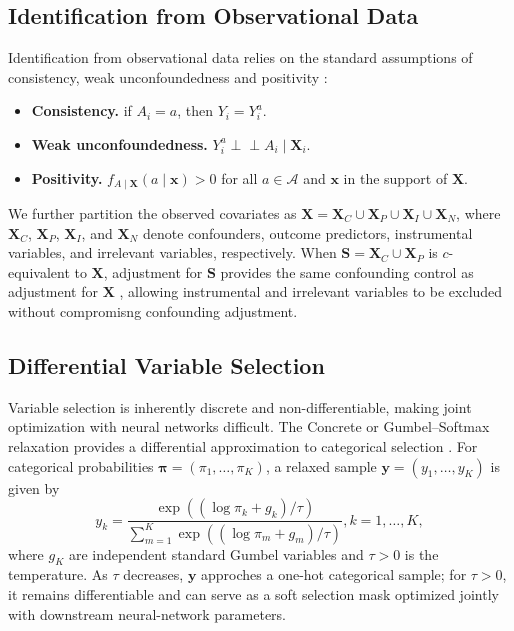 \documentclass[twoside]{article}
\theoremstyle{plain}
\theoremstyle{definition}
\theoremstyle{remark}
\newtheorem{proof sketch}[theorem]{Proof Sketch}
\begin{document}
{\subsection{Identification from Observational Data}
Identification from observational data relies on the standard assumptions of consistency, weak unconfoundedness and positivity 
\citep{rosenbaum1983central, hirano2004propensity, imai2004causal}:
\begin{itemize}
    \item \textbf{Consistency.} if $A_i=a$, then  $Y_i=Y_i^a$.
    \item \textbf{Weak unconfoundedness.} $Y_i^a \perp\!\!\!\perp A_i \mid \mathbf{X}_i$.
    \item \textbf{Positivity.}  
    $f_{A\mid \mathbf{X}}(a\mid \mathbf{x})>0$ for all $a\in\mathcal{A}$ and $\mathbf{x}$ in the support of $\mathbf{X}$.
\end{itemize}
We further partition the observed covariates as $\mathbf{X} = \mathbf{X}_C \cup \mathbf{X}_P \cup \mathbf{X}_I \cup \mathbf{X}_N$, 
where $\mathbf{X}_C$, $\mathbf{X}_P$, $\mathbf{X}_I$, and $\mathbf{X}_N$ denote confounders, outcome predictors, instrumental variables, and irrelevant variables, respectively. 
When $\textbf{S}= \mathbf{X}_C \cup \mathbf{X}_P$ is \(c\)-equivalent to  \(\mathbf{X}\), adjustment for $\textbf{S}$ provides the same confounding control as adjustment for  $\mathbf{X}$ \citep{pearl2014confounding, greenewald2021high}, allowing instrumental and irrelevant variables to be excluded without compromisng confounding adjustment. 


\vspace{-0.5em}
\subsection{Differential Variable Selection}
\vspace{-0.5em}
Variable selection is inherently discrete and non-differentiable, making joint optimization with neural networks difficult. The Concrete or Gumbel--Softmax relaxation provides a differential approximation to categorical selection \citep{maddison2017concrete,jang2017categorical}.
For categorical probabilities \(\boldsymbol{\pi}=(\pi_1,\ldots,\pi_K)\), 
a relaxed sample \(\boldsymbol{y}=(y_1,\ldots,y_K)\) is given by
\begin{equation}
    y_k =
    \frac{
        \exp\left((\log \pi_k + g_k)/\tau\right)
    }{
        \sum_{m=1}^{K}
        \exp\left((\log \pi_m + g_m)/\tau\right)
    },
    k=1,\ldots,K,
\end{equation}
where $g_K$ are independent standard Gumbel variables and \(\tau>0\) is the temperature. As $\tau$ decreases, $\boldsymbol{y}$ approches a one-hot categorical sample; for $\tau>0$, it remains differentiable and can serve as a soft selection mask optimized jointly with downstream neural-network parameters. 
}
\end{document}
